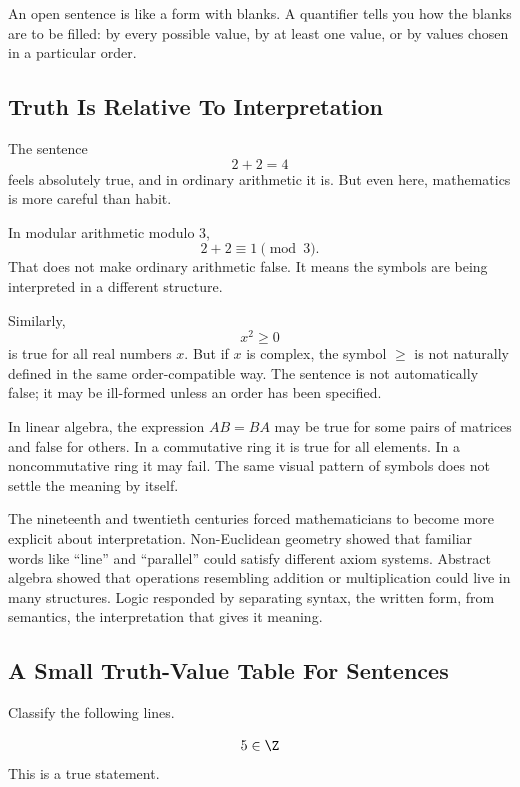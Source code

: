 \begin{intuitionbox}
An open sentence is like a form with blanks. A quantifier tells you how the blanks are to be filled: by every possible value, by at least one value, or by values chosen in a particular order.
\end{intuitionbox}

\subsection{Truth Is Relative To Interpretation}

The sentence
\[
2+2=4
\]
feels absolutely true, and in ordinary arithmetic it is. But even here, mathematics is more careful than habit.

In modular arithmetic modulo $3$,
\[
2+2\equiv 1\pmod 3.
\]
That does not make ordinary arithmetic false. It means the symbols are being interpreted in a different structure.

Similarly,
\[
x^2\geq0
\]
is true for all real numbers $x$. But if $x$ is complex, the symbol $\geq$ is not naturally defined in the same order-compatible way. The sentence is not automatically false; it may be ill-formed unless an order has been specified.

In linear algebra, the expression $AB=BA$ may be true for some pairs of matrices and false for others. In a commutative ring it is true for all elements. In a noncommutative ring it may fail. The same visual pattern of symbols does not settle the meaning by itself.

\begin{historybox}
The nineteenth and twentieth centuries forced mathematicians to become more explicit about interpretation. Non-Euclidean geometry showed that familiar words like ``line'' and ``parallel'' could satisfy different axiom systems. Abstract algebra showed that operations resembling addition or multiplication could live in many structures. Logic responded by separating syntax, the written form, from semantics, the interpretation that gives it meaning.
\end{historybox}

\subsection{A Small Truth-Value Table For Sentences}

Classify the following lines.

\[
5\in\Z
\]
This is a true statement.


